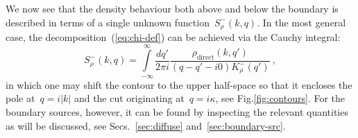 \documentclass[preprint,aps,eqsecnum]{revtex4-1}
\newcommand{\fminus}[1]{{#1}^{-}}
\newcommand{\dct}[1]{{#1}_\mathrm{direct}}
\begin{document}
We now see that the density behaviour both above and below the
boundary is described in terms of a single unknown
function~$\fminus{S}_\rho(k, q)$. In the most  general case,
the decomposition~(\ref{eq:chi-def})  can be achieved via the Cauchy integral:
\begin{equation}
  \label{eq:solution-chi}
  \fminus{S}_\rho(k, q) = \int\limits_{-\infty}^{\infty} \frac{dq'}{2\pi i}
  \frac{\dct{\rho}(k, q')}{(q - q' - i0) \fminus{K}_\rho(q')}
  \ ,
\end{equation}
in which one may shift the contour to the upper half-space so that
it encloses the pole at~$q = i |k|$ and the cut originating
at~$q = i \kappa$, see Fig.\ref{fig:contours}.
For the boundary sources, however, it can be found by inspecting
the relevant quantities as will be discussed,
see Secs.~\ref{sec:diffuse} and~\ref{sec:boundary-src}.
\end{document}
